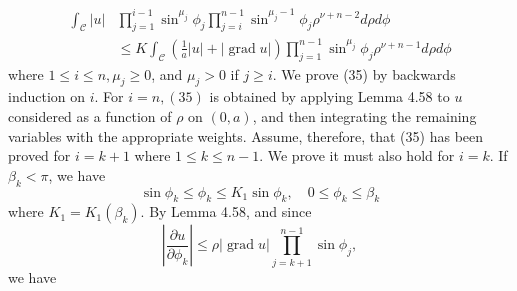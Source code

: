 \[
\begin{aligned}
\int_{\mathcal{C}}|u| & \prod_{j=1}^{i-1} \sin ^{\mu_j} \phi_j \prod_{j=i}^{n-1} \sin ^{\mu_j-1} \phi_j \rho^{\nu+n-2} d \rho d \phi \\
& \leq K \int_{\mathcal{C}}\left(\frac{1}{a}|u|+|\operatorname{grad} u|\right) \prod_{j=1}^{n-1} \sin ^{\mu_j} \phi_j \rho^{\nu+n-1} d \rho d \phi
\end{aligned}
\]
where $1 \leq i \leq n, \mu_j \geq 0$, and $\mu_j>0$ if $j \geq i$. We prove (35) by backwards induction on $i$. For $i=n,(35)$ is obtained by applying Lemma 4.58 to $u$ considered as a function of $\rho$ on $(0, a)$, and then integrating the remaining variables with the appropriate weights. Assume, therefore, that (35) has been proved for $i=k+1$ where $1 \leq k \leq n-1$. We prove it must also hold for $i=k$.
If $\beta_k<\pi$, we have
\[
\sin \phi_k \leq \phi_k \leq K_1 \sin \phi_k, \quad 0 \leq \phi_k \leq \beta_k
\]
where $K_1=K_1\left(\beta_k\right)$. By Lemma 4.58, and since
\[
\left|\frac{\partial u}{\partial \phi_k}\right| \leq \rho|\operatorname{grad} u| \prod_{j=k+1}^{n-1} \sin \phi_j,
\]
we have